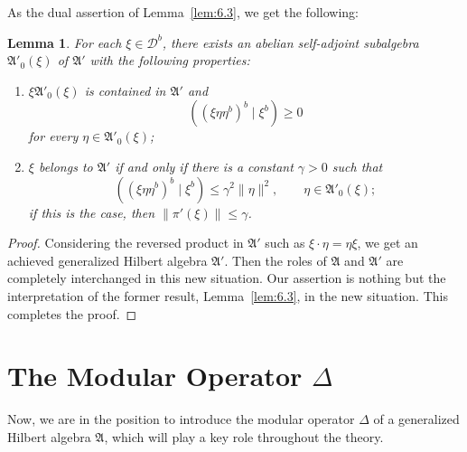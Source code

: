 \documentclass[12pt,b5paper,twoside]{article}
\theoremstyle{takesaki}
\newtheorem{lemma}{Lemma}[section]
\numberwithin{equation}{section}
\begin{document}
As the dual assertion of Lemma~\ref{lem:6.3}, we get the following:

\begingroup
\renewcommand{\thelemma}{6.3$'$}
\begin{lemma}\label{lem:6.3-prime}
For each $\xi\in\mathcal D^b$, there exists an abelian self-adjoint
subalgebra $\mathfrak A'_0(\xi)$ of $\mathfrak A'$ with the following
properties:
\begin{enumerate}[label=(\roman*)]
 \item $\xi\mathfrak A'_0(\xi)$ is contained in $\mathfrak A'$ and
 \begin{equation}
  ((\xi\eta\eta^b)^b\mid\xi^b)\geq0
  \tag{6.9$'$}\label{eq:6.9-prime}
 \end{equation}
 for every $\eta\in\mathfrak A'_0(\xi)$;
 \item $\xi$ belongs to $\mathfrak A'$ if and only if there is a
 constant $\gamma>0$ such that
 \begin{equation}
  ((\xi\eta\eta^b)^b\mid\xi^b)
  \leq\gamma^2\|\eta\|^2,
  \qquad\eta\in\mathfrak A'_0(\xi);
  \tag{6.10$'$}\label{eq:6.10-prime}
 \end{equation}
 if this is the case, then $\|\pi'(\xi)\|\leq\gamma$.
\end{enumerate}
\end{lemma}
\endgroup

\begin{proof}
Considering the reversed product in $\mathfrak A'$ such as
$\xi\cdot\eta=\eta\xi$, we get an achieved generalized Hilbert algebra
$\mathfrak A'$.  Then the roles of $\mathfrak A$ and $\mathfrak A'$ are
completely interchanged in this new situation.  Our assertion is
nothing but the interpretation of the former result,
Lemma~\ref{lem:6.3}, in the new situation.  This completes the proof.
\end{proof}

\section{The Modular Operator \texorpdfstring{$\Delta$}{Delta}}
\label{sec:7}

Now, we are in the position to introduce the modular operator $\Delta$
of a generalized Hilbert algebra $\mathfrak A$, which will play a key
role throughout the theory.
\end{document}

